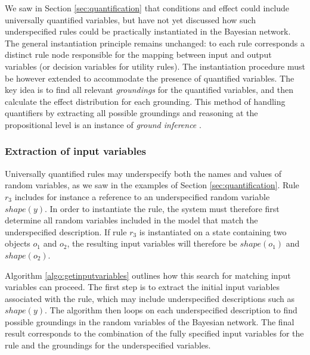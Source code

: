We saw in Section \ref{sec:quantification} that conditions and effect could include universally quantified variables, but have not yet discussed how such underspecified rules could be practically instantiated in the Bayesian network. The general instantiation principle remains unchanged: to each rule corresponds a distinct rule node responsible for the mapping between input and output variables (or decision variables for utility rules). The instantiation procedure must be however extended to accommodate the presence of quantified variables.  The key idea is to find all relevant \textit{groundings} for the quantified variables, and then calculate the effect distribution for each grounding. This method of handling quantifiers by extracting all possible groundings and reasoning at the propositional level is an instance of \textit{ground inference} \citep{getoor:srlbook07}. 

\subsubsection*{Extraction of input variables}

Universally quantified rules may underspecify both the names and values of random variables, as we saw in the examples of Section \ref{sec:quantification}.  Rule $r_3$ includes for instance a reference to an underspecified random variable $\mathit{shape}(y)$.  In order to instantiate the rule, the system must therefore first determine all random variables included in the model that match the underspecified description. If rule $r_3$ is instantiated on a state containing two objects $o_1$ and $o_2$, the resulting input variables will therefore be $\mathit{shape}(o_1)$ and $\mathit{shape}(o_2)$. 

Algorithm \ref{algo:getinputvariables} outlines how this search for matching input variables can proceed. The first step is to extract the initial input variables associated with the rule, which may include underspecified descriptions such as $\mathit{shape}(y)$. The algorithm then loops on each underspecified description to find possible groundings in the random variables of the Bayesian network.  The final result corresponds to the combination of the fully specified input variables for the rule and the groundings for the underspecified variables.  

